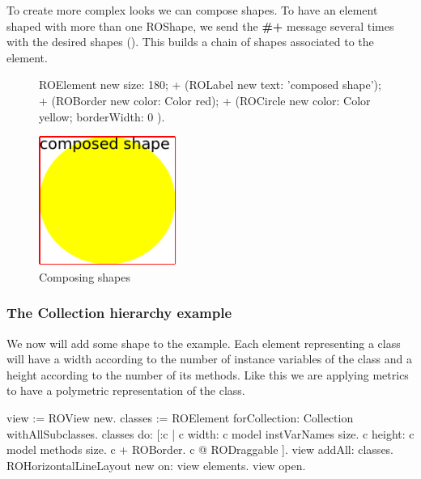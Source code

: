 \documentclass[a4paper,10pt,twoside]{book}
\begin{document}
To create more complex looks we can compose shapes. To have an element shaped with more than one ROShape, we send the \textbf{\#+} message several times with the desired shapes (). This builds a chain of shapes associated to the element.

\begin{figure}[H]
      \begin{minipage}[t]{0.5\textwidth}
      \vspace{0pt}
     \begin{code}
     
ROElement new 
	size: 180;  
	+ (ROLabel new text: 'composed shape');
	+ (ROBorder new color: Color red); 
	+ (ROCircle new color: Color yellow; 
					borderWidth: 0 ).	\end{code}
   \end{minipage}
   \hfill
   \begin{minipage}[t]{0.4\textwidth}
      \vspace{0pt} \raggedright
       \centering
		\includegraphics[width=0.4\textwidth]{composed}
   \end{minipage}
\caption{Composing shapes}
\label{fig:composed}
\end{figure} 

\subsubsection*{The Collection hierarchy example}
We now will add some shape to the  example. Each element representing a class will have a width according to the number of instance variables of the class and a height according to the number of its methods. Like this we are applying metrics to have a polymetric representation of the class.

\begin{code}{}
view := ROView new.
classes := ROElement forCollection: Collection withAllSubclasses.
classes do: [:c | 
	c width: c model instVarNames size.
	c height: c model methods size.
	c + ROBorder. 
	c @ RODraggable ].
view addAll: classes.
ROHorizontalLineLayout new on: view elements.
view open.
\end{code}
\end{document}
